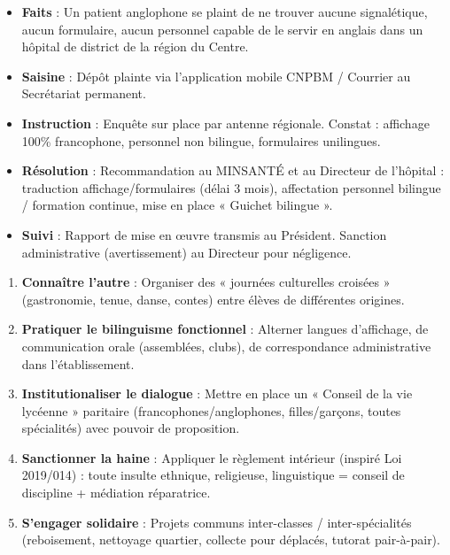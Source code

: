 \documentclass[11pt]{article}
\begin{document}
\begin{exemplebox}
\begin{itemize}
    \item \textbf{Faits} : Un patient anglophone se plaint de ne trouver aucune signalétique, aucun formulaire, aucun personnel capable de le servir en anglais dans un hôpital de district de la région du Centre.
    \item \textbf{Saisine} : Dépôt plainte via l'application mobile CNPBM / Courrier au Secrétariat permanent.
    \item \textbf{Instruction} : Enquête sur place par antenne régionale. Constat : affichage 100\% francophone, personnel non bilingue, formulaires unilingues.
    \item \textbf{Résolution} : Recommandation au MINSANTÉ et au Directeur de l'hôpital : traduction affichage/formulaires (délai 3 mois), affectation personnel bilingue / formation continue, mise en place « Guichet bilingue ».
    \item \textbf{Suivi} : Rapport de mise en œuvre transmis au Président. Sanction administrative (avertissement) au Directeur pour négligence.
\end{itemize}
\end{exemplebox}

\begin{methode}
\begin{enumerate}
    \item \textbf{Connaître l'autre} : Organiser des « journées culturelles croisées » (gastronomie, tenue, danse, contes) entre élèves de différentes origines.
    \item \textbf{Pratiquer le bilinguisme fonctionnel} : Alterner langues d'affichage, de communication orale (assemblées, clubs), de correspondance administrative dans l'établissement.
    \item \textbf{Institutionaliser le dialogue} : Mettre en place un « Conseil de la vie lycéenne » paritaire (francophones/anglophones, filles/garçons, toutes spécialités) avec pouvoir de proposition.
    \item \textbf{Sanctionner la haine} : Appliquer le règlement intérieur (inspiré Loi 2019/014) : toute insulte ethnique, religieuse, linguistique = conseil de discipline + médiation réparatrice.
    \item \textbf{S'engager solidaire} : Projets communs inter-classes / inter-spécialités (reboisement, nettoyage quartier, collecte pour déplacés, tutorat pair-à-pair).
\end{enumerate}
\end{methode}
\end{document}
